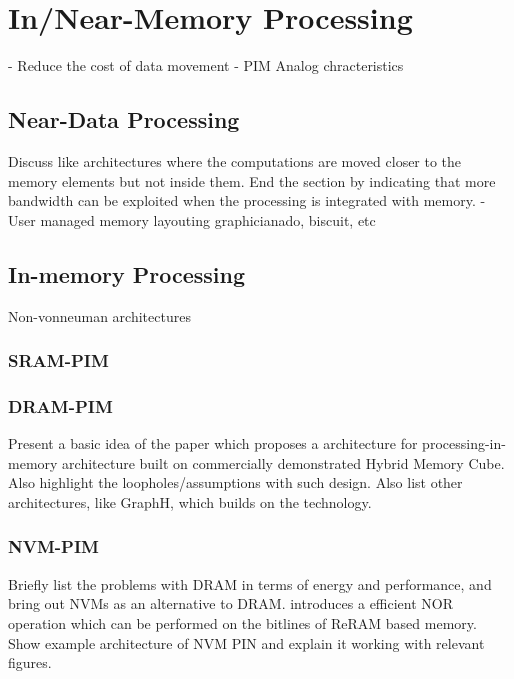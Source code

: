 \section{In/Near-Memory Processing}
- Reduce the cost of data movement
- PIM Analog chracteristics


  \subsection{Near-Data Processing}
  Discuss \cite{Biscuit} like architectures where the computations are moved closer to the memory elements but not inside them.
  End the section by indicating that more bandwidth can be exploited when the processing is integrated with memory.
  - User managed memory layouting graphicianado, biscuit, etc
  
  \subsection{In-memory Processing}
    Non-vonneuman architectures
    \subsubsection{SRAM-PIM}
    
    \subsubsection{DRAM-PIM}
      Present a basic idea of the \cite{AMC} paper which proposes a architecture for processing-in-memory architecture built on commercially demonstrated Hybrid Memory Cube. Also highlight the loopholes/assumptions with such design. Also list other architectures, like GraphH\cite{GraphH}, which builds on the technology.

    \subsubsection{NVM-PIM}
      Briefly list the problems with DRAM in terms of energy and performance, and bring out NVMs as an alternative to DRAM.
      \cite{MagicNOR} introduces a efficient NOR operation which can be performed on the bitlines of ReRAM based memory. Show example architecture of NVM PIN and explain it working with relevant figures.
